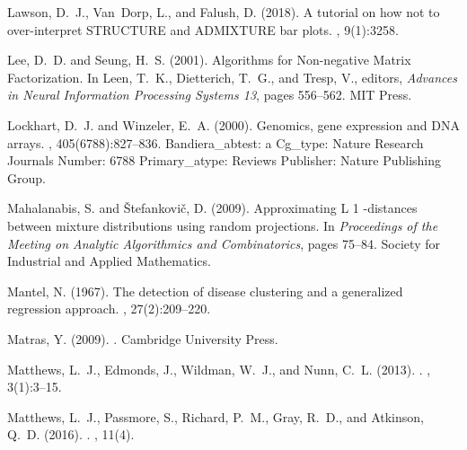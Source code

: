 \documentclass[a4]{article}
\newcommand{\+}[1]{\mathbf{#1}}
\begin{document}
\begin{thebibliography}{}
Lawson, D.~J., Van~Dorp, L., and Falush, D. (2018).
\newblock A tutorial on how not to over-interpret {{STRUCTURE}} and
  {{ADMIXTURE}} bar plots.
, 9(1):3258.

Lee, D.~D. and Seung, H.~S. (2001).
\newblock Algorithms for {{Non}}-negative {{Matrix Factorization}}.
\newblock In Leen, T.~K., Dietterich, T.~G., and Tresp, V., editors, {\em
  Advances in {{Neural Information Processing Systems}} 13}, pages 556--562.
  {MIT Press}.

Lockhart, D.~J. and Winzeler, E.~A. (2000).
\newblock Genomics, gene expression and {DNA} arrays.
, 405(6788):827--836.
\newblock Bandiera\_abtest: a Cg\_type: Nature Research Journals Number: 6788
  Primary\_atype: Reviews Publisher: Nature Publishing Group.

Mahalanabis, S. and {\v S}tefankovi{\v c}, D. (2009).
\newblock Approximating {{L}} 1 -distances between mixture distributions using
  random projections.
\newblock In {\em Proceedings of the {{Meeting}} on {{Analytic Algorithmics}}
  and {{Combinatorics}}}, pages 75--84. {Society for Industrial and Applied
  Mathematics}.

Mantel, N. (1967).
\newblock The detection of disease clustering and a generalized regression
  approach.
, 27(2):209--220.

Matras, Y. (2009).
.
\newblock Cambridge University Press.

Matthews, L.~J., Edmonds, J., Wildman, W.~J., and Nunn, C.~L. (2013).
.
, 3(1):3--15.

Matthews, L.~J., Passmore, S., Richard, P.~M., Gray, R.~D., and Atkinson, Q.~D.
  (2016).
.
, 11(4).


\end{thebibliography}
\end{document}
